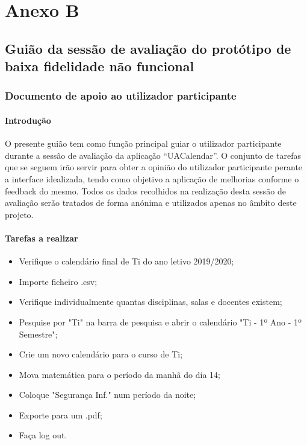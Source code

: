 \documentclass[11pt, twoside]{report}
\begin{document}
	
	\chapter*{Anexo B}
		\section*{Guião da sessão de avaliação do protótipo de baixa fidelidade não funcional}
		\subsection*{Documento de apoio ao utilizador participante}
			
		
		\subsubsection*{Introdução}
			O presente guião tem como função principal guiar o utilizador participante durante a sessão de avaliação da aplicação “UACalendar”. O conjunto de tarefas que se seguem irão servir para obter a opinião do utilizador participante perante a interface idealizada, tendo como objetivo a aplicação de melhorias conforme o feedback do mesmo. Todos os dados recolhidos na realização desta sessão de avaliação serão tratados de forma anónima e utilizados apenas no âmbito deste projeto.
	
		\subsubsection*{Tarefas a realizar}	
	\begin{itemize}
		\item Verifique o calendário final de Ti do ano letivo 2019/2020;
		\item Importe ficheiro .csv;
		\item Verifique individualmente quantas disciplinas, salas e docentes existem;
		\item Pesquise por "Ti" na barra de pesquisa e abrir o calendário "Ti - 1º Ano - 1º Semestre";
		\item Crie um novo calendário para o curso de Ti;
		\item Mova matemática para o período da manhã do dia 14;
		\item Coloque "Segurança Inf." num período da noite;
		\item Exporte para um .pdf;
		\item Faça log out.
	\end{itemize}
\end{document}
